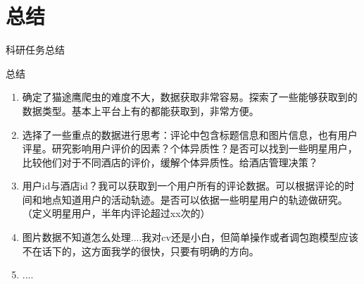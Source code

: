 \documentclass[10pt]{beamer}
\begin{document}
\section{总结}
\begin{frame}{科研任务总结}
    \begin{block}{总结}
        \begin{enumerate}
            \item 确定了猫途鹰爬虫的难度不大，数据获取非常容易。探索了一些能够获取到的数据类型。基本上平台上有的都能获取到，非常方便。
            \item 选择了一些重点的数据进行思考：评论中包含标题信息和图片信息，也有用户评星。研究影响用户评价的因素？个体异质性？是否可以找到一些明星用户，比较他们对于不同酒店的评价，缓解个体异质性。给酒店管理决策？
            \item 用户id与酒店id？我可以获取到一个用户所有的评论数据。可以根据评论的时间和地点知道用户的活动轨迹。是否可以依据一些明星用户的轨迹做研究。（定义明星用户，半年内评论超过xx次的）
            \item 图片数据不知道怎么处理....我对cv还是小白，但简单操作或者调包跑模型应该不在话下的，这方面我学的很快，只要有明确的方向。
            \item ....
        \end{enumerate}
    \end{block}
\end{frame}
\end{document}
